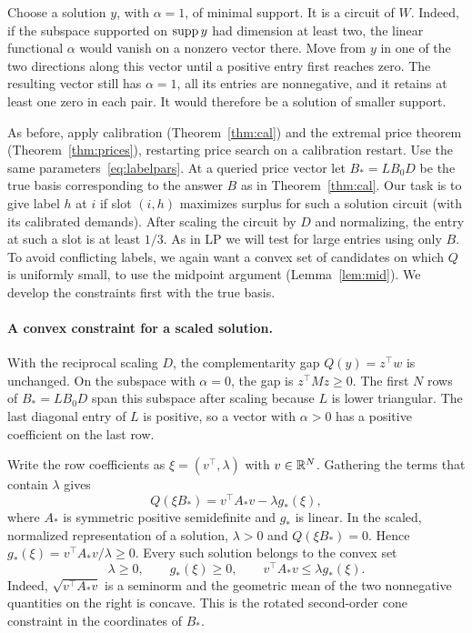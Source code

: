 Choose a solution \(y\), with \(\alpha=1\), of minimal support.
It is a circuit of \(W\). Indeed, if the subspace supported on
\(\operatorname{supp} y\) had dimension at least two, the linear functional
\(\alpha\) would vanish on a nonzero vector there. Move from \(y\)
in one of the two directions along this vector until a positive
entry first reaches zero. The resulting vector still has
\(\alpha=1\), all its entries are nonnegative, and it retains at
least one zero in each pair. It would therefore be a solution
of smaller support.

As before, apply calibration (Theorem~\ref{thm:cal})
and the extremal price theorem (Theorem~\ref{thm:prices}),
restarting price search on a calibration restart.
Use the same parameters~\eqref{eq:labelpars}.
At a queried price vector let \(B_*=LB_0D\)
be the true basis corresponding to the answer \(B\)
as in Theorem~\ref{thm:cal}.
Our task is to give label \(h\) at \(i\)
if slot \((i,h)\) maximizes surplus for such a solution circuit
(with its calibrated demands).
After scaling the circuit by \(D\) and normalizing, the entry
at such a slot is at least \(1/3\).
As in LP we will test for large entries using only \(B\).
To avoid conflicting labels, we again want
a convex set of candidates on which \(Q\) is uniformly small,
to use the midpoint argument (Lemma~\ref{lem:mid}).
We develop the constraints first with the true basis.

\paragraph{A convex constraint for a scaled solution.}
With the reciprocal scaling \(D\), the complementarity gap
\(Q(y)=z^\top w\) is unchanged. On the subspace with \(\alpha=0\),
the gap is \(z^\top Mz\ge0\). The first \(N\) rows of \(B_*=LB_0D\)
span this subspace after scaling because \(L\) is lower triangular.
The last diagonal entry of \(L\) is positive, so a vector with
\(\alpha>0\) has a positive coefficient on the last row.

Write the row coefficients as \(\xi=(v^\top,\lambda)\) with
\(v\in\mathbb R^N\). Gathering the terms that contain \(\lambda\) gives
\[
 Q(\xi B_*)=v^\top A_*v-\lambda g_*(\xi),
\]
where \(A_*\) is symmetric positive semidefinite and \(g_*\) is
linear. In the scaled, normalized representation of a solution,
\(\lambda>0\) and \(Q(\xi B_*)=0\). Hence
\(g_*(\xi)=v^\top A_*v/\lambda\ge0\). Every such solution belongs to
the convex set
\[
 \lambda\ge0,\qquad g_*(\xi)\ge0,\qquad
 v^\top A_*v\le \lambda g_*(\xi).
\]
Indeed, \(\sqrt{v^\top A_*v}\) is a seminorm and the geometric mean of
the two nonnegative quantities on the right is concave. This is the
rotated second-order cone constraint in the coordinates of \(B_*\).

